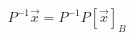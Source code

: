 \documentclass[preview]{standalone}
\begin{document}
\begin{align*}
P^{-1} \vec{x} = P^{-1} P [\vec{x}]_B
\end{align*}
\end{document}

